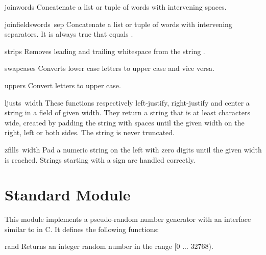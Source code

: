 \begin{funcdesc}{join}{words}
Concatenate a list or tuple of words with intervening spaces.
\end{funcdesc}

\begin{funcdesc}{joinfields}{words\, sep}
Concatenate a list or tuple of words with intervening separators.
It is always true that
equals .
\end{funcdesc}

\begin{funcdesc}{strip}{s}
Removes leading and trailing whitespace from the string
.
\end{funcdesc}

\begin{funcdesc}{swapcase}{s}
Converts lower case letters to upper case and vice versa.
\end{funcdesc}

\begin{funcdesc}{upper}{s}
Convert letters to upper case.
\end{funcdesc}

\begin{funcdesc}{ljust}{s\, width}
These functions respectively left-justify, right-justify and center a
string in a field of given width.
They return a string that is at least
characters wide, created by padding the string
with spaces until the given width on the right, left or both sides.
The string is never truncated.
\end{funcdesc}

\begin{funcdesc}{zfill}{s\, width}
Pad a numeric string on the left with zero digits until the given
width is reached.  Strings starting with a sign are handled correctly.
\end{funcdesc}

\section{Standard Module }

 This module implements a pseudo-random number
generator with an interface similar to  in C.  It defines
the following functions:

\renewcommand{\indexsubitem}{(in module rand)}
\begin{funcdesc}{rand}{}
Returns an integer random number in the range [0 ... 32768).
\end{funcdesc}

